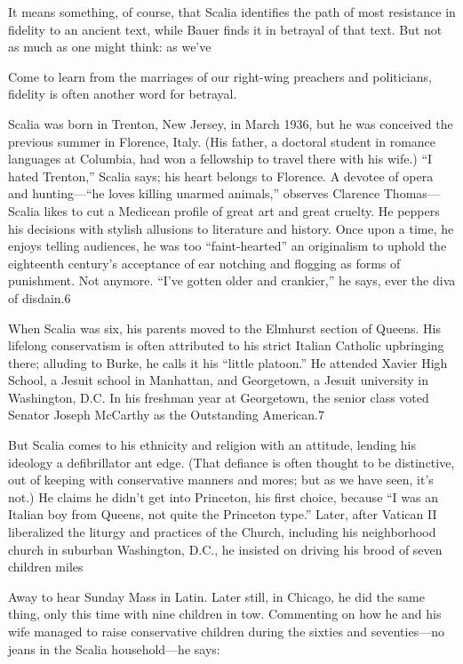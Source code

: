  \par 
It means something, of course, that Scalia identifies the path of most resistance in fidelity to an ancient text, while Bauer finds it in betrayal of that text. But not as much as one might think: as we’ve
 \par 
Come to learn from the marriages of our right-wing preachers and politicians, fidelity is often another word for betrayal.
 \par 
Scalia was born in Trenton, New Jersey, in March 1936, but he was conceived the previous summer in Florence, Italy. (His father, a doctoral student in romance languages at Columbia, had won a fellowship to travel there with his wife.) “I hated Trenton,” Scalia says; his heart belongs to Florence. A devotee of opera and hunting—“he loves killing unarmed animals,” observes Clarence Thomas—Scalia likes to cut a Medicean profile of great art and great cruelty. He peppers his decisions with stylish allusions to literature and history. Once upon a time, he enjoys telling audiences, he was too “faint-hearted” an originalism to uphold the eighteenth century’s acceptance of ear notching and flogging as forms of punishment. Not anymore. “I’ve gotten older and crankier,” he says, ever the diva of disdain.{\color{blue}6}
 \par 
When Scalia was six, his parents moved to the Elmhurst section of Queens. His lifelong conservatism is often attributed to his strict Italian Catholic upbringing there; alluding to Burke, he calls it his “little platoon.” He attended Xavier High School, a Jesuit school in Manhattan, and Georgetown, a Jesuit university in Washington, D.C. In his freshman year at Georgetown, the senior class voted Senator Joseph McCarthy as the Outstanding American.{\color{blue}7}
 \par 
But Scalia comes to his ethnicity and religion with an attitude, lending his ideology a defibrillator ant edge. (That defiance is often thought to be distinctive, out of keeping with conservative manners and mores; but as we have seen, it’s not.) He claims he didn’t get into Princeton, his first choice, because “I was an Italian boy from Queens, not quite the Princeton type.” Later, after Vatican II liberalized the liturgy and practices of the Church, including his neighborhood church in suburban Washington, D.C., he insisted on driving his brood of seven children miles
 \par 
Away to hear Sunday Mass in Latin. Later still, in Chicago, he did the same thing, only this time with nine children in tow. Commenting on how he and his wife managed to raise conservative children during the sixties and seventies—no jeans in the Scalia household—he says:
